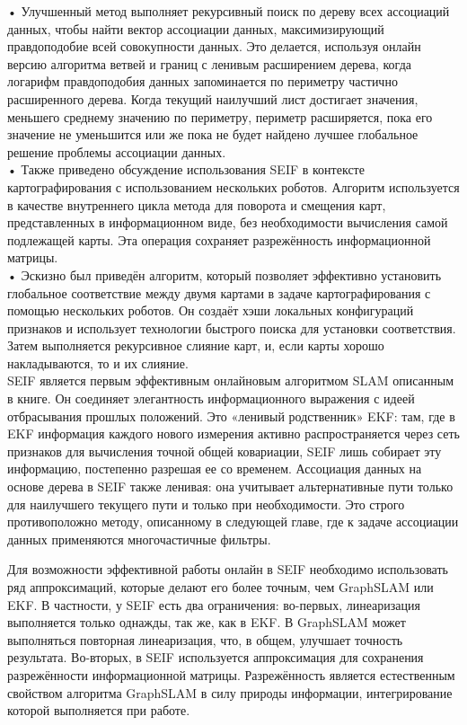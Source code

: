 \documentclass[10pt,a4paper]{article}
\begin{document}
•	Улучшенный метод выполняет рекурсивный поиск по дереву всех ассоциаций данных, чтобы найти вектор ассоциации данных, максимизирующий правдоподобие всей совокупности данных. Это делается, используя онлайн версию алгоритма ветвей и границ с ленивым расширением дерева, когда логарифм правдоподобия данных запоминается по периметру частично расширенного дерева. Когда текущий наилучший лист достигает значения, меньшего среднему значению по периметру, периметр расширяется, пока его значение не уменьшится или же пока не будет найдено лучшее глобальное решение проблемы ассоциации данных.\\

•	Также приведено обсуждение использования SEIF в контексте картографирования с использованием нескольких роботов. Алгоритм используется в качестве внутреннего цикла метода для поворота и смещения карт, представленных в информационном виде, без необходимости вычисления самой подлежащей карты. Эта операция сохраняет разрежённость информационной матрицы.\\

•	Эскизно был приведён алгоритм, который позволяет эффективно установить глобальное соответствие между двумя картами в задаче картографирования с помощью нескольких роботов. Он создаёт хэши локальных конфигураций признаков и использует технологии быстрого поиска для установки соответствия. Затем выполняется рекурсивное слияние карт, и, если карты хорошо накладываются, то и их слияние.\\

SEIF является первым эффективным онлайновым алгоритмом SLAM описанным в книге. Он соединяет элегантность информационного выражения с идеей отбрасывания прошлых положений. Это «ленивый родственник» EKF: там, где в EKF информация каждого нового измерения активно распространяется через сеть признаков для вычисления точной общей ковариации, SEIF лишь собирает эту информацию, постепенно разрешая ее со временем. Ассоциация данных на основе дерева в SEIF также ленивая: она учитывает альтернативные пути только для наилучшего текущего пути и только при необходимости. Это строго противоположно методу, описанному в следующей главе, где  к задаче ассоциации данных применяются многочастичные фильтры. 

Для возможности эффективной работы онлайн в SEIF необходимо использовать ряд аппроксимаций, которые делают его более точным, чем GraphSLAM или EKF. В частности, у SEIF есть два ограничения: во-первых, линеаризация выполняется только однажды, так же, как в EKF. В GraphSLAM может выполняться повторная линеаризация, что, в общем, улучшает точность результата. Во-вторых, в SEIF используется аппроксимация для сохранения разрежённости информационной матрицы. Разрежённость является естественным свойством алгоритма GraphSLAM в силу природы информации, интегрирование которой выполняется при работе.
\end{document}

